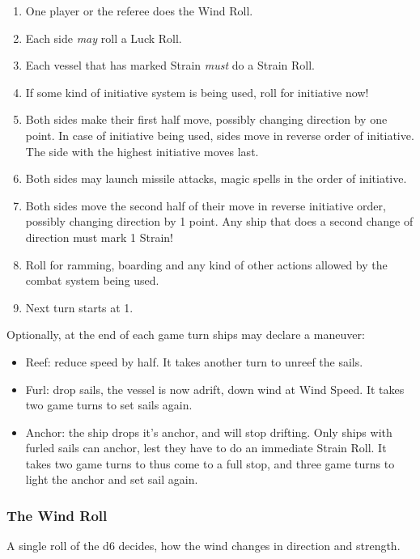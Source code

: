 \documentclass[11pt]{wbzine}
\begin{document}
\begin{multicols}{2}
\begin{enumerate}
\item
  One player or the referee does the Wind Roll.
\item
  Each side \emph{may} roll a Luck Roll.
\item
  Each vessel that has marked Strain \emph{must} do a Strain Roll.
\item
  If some kind of initiative system is being used, roll for initiative
  now!
\item
  Both sides make their first half move, possibly changing direction by
  one point. In case of initiative being used, sides move in reverse
  order of initiative. The side with the highest initiative moves last.
\item
  Both sides may launch missile attacks, magic spells in the order of
  initiative.
\item
  Both sides move the second half of their move in reverse initiative
  order, possibly changing direction by 1 point. Any ship that does a
  second change of direction must mark 1 Strain!
\item
  Roll for ramming, boarding and any kind of other actions allowed by
  the combat system being used.
\item
  Next turn starts at 1.
\end{enumerate}

Optionally, at the end of each game turn ships may declare a maneuver:

\begin{itemize}
\item
  Reef: reduce speed by half. It takes another turn to unreef the sails.
\item
  Furl: drop sails, the vessel is now adrift, down wind at Wind Speed.
  It takes two game turns to set sails again.
\item
  Anchor: the ship drops it's anchor, and will stop drifting. Only ships
  with furled sails can anchor, lest they have to do an immediate Strain
  Roll. It takes two game turns to thus come to a full stop, and three
  game turns to light the anchor and set sail again.
\end{itemize}

\subsubsection{The Wind Roll}

A single roll of the d6 decides, how the wind changes in direction and
strength.


\end{multicols}
\end{document}
